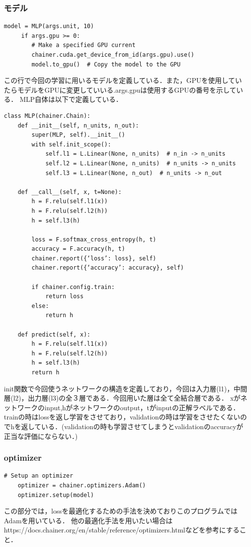 \subsubsection{モデル}
\begin{lstlisting}[basicstyle=\ttfamily\footnotesize, frame=single]
 model = MLP(args.unit, 10)
     if args.gpu >= 0:
        # Make a specified GPU current
        chainer.cuda.get_device_from_id(args.gpu).use()
        model.to_gpu()  # Copy the model to the GPU
\end{lstlisting}
この行で今回の学習に用いるモデルを定義している．また，GPUを使用していたらモデルをGPUに変更していいる.args.gpuは使用するGPUの番号を示している．
MLP自体は以下で定義している．
\begin{lstlisting}[basicstyle=\ttfamily\footnotesize, frame=single]
class MLP(chainer.Chain):
    def __init__(self, n_units, n_out):
        super(MLP, self).__init__()
        with self.init_scope():
            self.l1 = L.Linear(None, n_units)  # n_in -> n_units
            self.l2 = L.Linear(None, n_units)  # n_units -> n_units
            self.l3 = L.Linear(None, n_out)  # n_units -> n_out

    def __call__(self, x, t=None):
        h = F.relu(self.l1(x))
        h = F.relu(self.l2(h))
        h = self.l3(h)

        loss = F.softmax_cross_entropy(h, t)
        accuracy = F.accuracy(h, t)
        chainer.report({‘loss’: loss}, self)
        chainer.report({‘accuracy’: accuracy}, self)

        if chainer.config.train:
            return loss
        else:
            return h

    def predict(self, x):
        h = F.relu(self.l1(x))
        h = F.relu(self.l2(h))
        h = self.l3(h)
        return h
\end{lstlisting}

init関数で今回使うネットワークの構造を定義しており，今回は入力層(l1)，中間層(l2)，出力層(l3)の全３層である．今回用いた層は全て全結合層である．
xがネットワークのinput,hがネットワークのoutput，tがinputの正解ラベルである．trainの時はlossを返し学習をさせており，validationの時は学習をさせたくないのでhを返している．(validationの時も学習させてしまうとvalidationのaccuracyが正当な評価にならない．)

\subsubsection{optimizer}
\begin{lstlisting}[basicstyle=\ttfamily\footnotesize, frame=single]
    # Setup an optimizer
    optimizer = chainer.optimizers.Adam()
    optimizer.setup(model)
\end{lstlisting}
この部分では，lossを最適化するための手法を決めておりこのプログラムではAdamを用いている．
他の最適化手法を用いたい場合はhttps://docs.chainer.org/en/stable/reference/optimizers.htmlなどを参考にすること．

